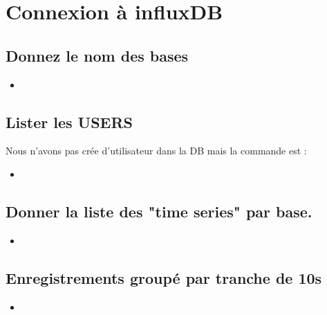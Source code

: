\documentclass[10pt,a4paper]{article}
\newcommand{\insertcode}[2]{\begin{itemize}\item[]\end{itemize}}
\begin{document}
\newpage
\section{Connexion à influxDB}

\subsection{Donnez le nom des bases}
\insertcode{commande/11.txt}{Liste des Tables}

 \subsection{Lister les USERS }
 Nous n'avons pas crée d'utilisateur dans la DB mais la commande est :
 \insertcode{commande/12.txt}{Liste USERS}
 
 \subsection{Donner la liste des "time series" par base.}
 \insertcode{commande/13.txt}{SHOW SERIES}
 
 \newpage
 \subsection{Enregistrements groupé par tranche de 10s }
 \insertcode{commande/14.txt}{GROUPE BY}
\end{document}
